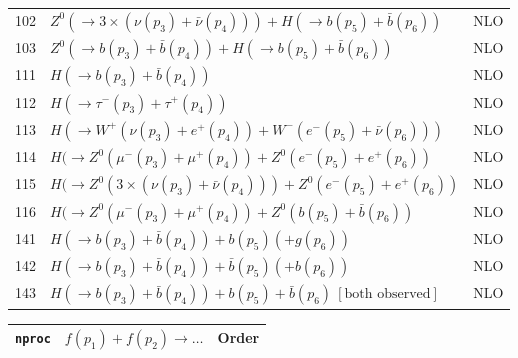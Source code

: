 \documentclass[12pt]{article}
\begin{document}
\begin{itemize}
\begin{table}
\begin{center}
\begin{tabular}{|l|l|l|}
102& $ Z^0(\to 3\times(\nu(p_3)+\bar{\nu}(p_4))) + H(\to b(p_5)+\bar{b}(p_6)) $ & NLO \\
103& $ Z^0(\to b(p_3)+\bar{b}(p_4)) + H(\to b(p_5)+\bar{b}(p_6)) $ & NLO \\     
\hline 
111& $ H(\to b(p_3)+\bar{b}(p_4)) $ & NLO \\
112& $ H(\to \tau^-(p_3)+\tau^+(p_4)) $ & NLO \\
113& $ H(\to  W^+(\nu(p_3)+e^+(p_4)) + W^-(e^-(p_5)+\bar{\nu}(p_6))) $ & NLO \\
114& $ H(\to Z^0(\mu^-(p_3)+\mu^+(p_4)) + Z^0(e^-(p_5)+e^+(p_6)) $ & NLO \\
115& $ H(\to Z^0(3\times(\nu(p_3)+\bar{\nu}(p_4)))+ Z^0(e^-(p_5)+e^+(p_6)) $ & NLO \\
116& $ H(\to Z^0(\mu^-(p_3)+\mu^+(p_4)) + Z^0(b(p_5)+\bar{b}(p_6)) $ & NLO \\
\hline 
141& $ H(\to b(p_3)+\bar{b}(p_4)) + b(p_5) (+g(p_6)) $ & NLO \\
142& $ H(\to b(p_3)+\bar{b}(p_4)) + \bar{b}(p_5) (+b(p_6)) $ & NLO \\
143& $ H(\to b(p_3)+\bar{b}(p_4)) + b(p_5) + \bar{b}(p_6) ~[ \mbox{both observed} ] $ & NLO \\
\hline 
\end{tabular}
\end{center}
\end{table}
\begin{table}
\begin{center}
\hspace*{-1.5cm}
\begin{tabular}{|l|l|l|}
\hline
{\tt nproc} & $ f(p_1)+f(p_2) \to \ldots $& Order \\ 
\hline


\end{tabular}
\end{center}
\end{table}
\end{itemize}
\end{document}
